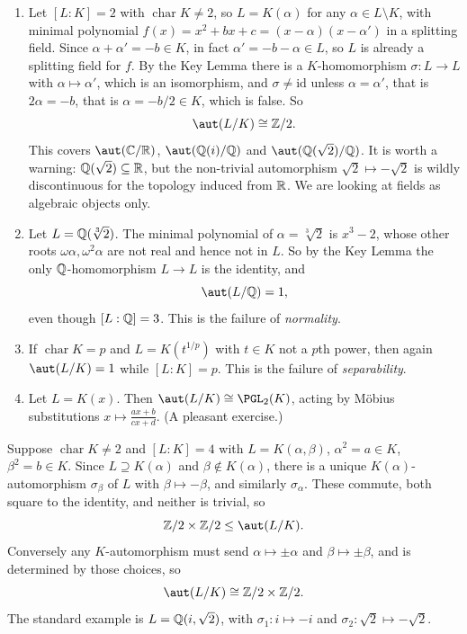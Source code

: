 \documentclass[a4paper]{scrartcl}
\newcommand{\charr}{\operatorname{char}}
\begin{document}
\begin{example}\label{ex:autexamples}
	\begin{enumerate}[label=(\roman*)]
		\item Let $[L:K] = 2$ with $\charr K \neq 2$, so $L = K(\alpha)$ for any $\alpha \in L\setminus K$, with minimal polynomial $f(x) = x^2+bx+c = (x-\alpha)(x-\alpha')$ in a splitting field. Since $\alpha + \alpha' = -b \in K$, in fact $\alpha' = -b-\alpha \in L$, so $L$ is already a splitting field for $f$. By the Key Lemma there is a $K$-homomorphism $\sigma : L \to L$ with $\alpha \mapsto \alpha'$, which is an isomorphism, and $\sigma \neq \mathrm{id}$ unless $\alpha = \alpha'$, that is $2\alpha = -b$, that is $\alpha = -b/2 \in K$, which is false. So
		$$\aut(L/K) \cong \Z/2.$$
		This covers $\aut(\C/\R)$, $\aut(\Q(i)/\Q)$ and $\aut(\Q(\sqrt 2)/\Q)$. It is worth a warning: $\mathbb{Q}(\sqrt 2) \subseteq \mathbb{R}$, but the non-trivial automorphism $\sqrt 2 \mapsto -\sqrt 2$ is wildly discontinuous for the topology induced from $\mathbb{R}$. We are looking at fields as algebraic objects only.
		\item Let $L = \mathbb{Q}(\sqrt[3]2)$. The minimal polynomial of $\alpha = \sqrt[3]2$ is $x^3-2$, whose other roots $\omega\alpha, \omega^2\alpha$ are not real and hence not in $L$. So by the Key Lemma the only $\mathbb{Q}$-homomorphism $L \to L$ is the identity, and
		$$\aut(L/\Q) = 1,$$
		even though $[L:\mathbb{Q}] = 3$. This is the failure of \emph{normality}.
		\item If $\charr K = p$ and $L = K(t^{1/p})$ with $t \in K$ not a $p$th power, then again $\aut(L/K) = 1$ while $[L:K] = p$. This is the failure of \emph{separability}.
		\item Let $L = K(x)$. Then $\aut(L/K) \cong \PGL_2(K)$, acting by M\"obius substitutions $x \mapsto \frac{ax+b}{cx+d}$. (A pleasant exercise.)
	\end{enumerate}
\end{example}

\begin{example}\label{ex:biquad}
	Suppose $\charr K \neq 2$ and $[L:K] = 4$ with $L = K(\alpha,\beta)$, $\alpha^2 = a \in K$, $\beta^2 = b \in K$. Since $L \supseteq K(\alpha)$ and $\beta \notin K(\alpha)$, there is a unique $K(\alpha)$-automorphism $\sigma_\beta$ of $L$ with $\beta \mapsto -\beta$, and similarly $\sigma_\alpha$. These commute, both square to the identity, and neither is trivial, so
	$$\Z/2 \times \Z/2 \leq \aut(L/K).$$
	Conversely any $K$-automorphism must send $\alpha \mapsto \pm\alpha$ and $\beta \mapsto \pm\beta$, and is determined by those choices, so
	$$\aut(L/K) \cong \Z/2\times\Z/2.$$
	The standard example is $L = \mathbb{Q}(i,\sqrt 2)$, with $\sigma_1 : i \mapsto -i$ and $\sigma_2 : \sqrt 2 \mapsto -\sqrt 2$.
\end{example}
\end{document}
